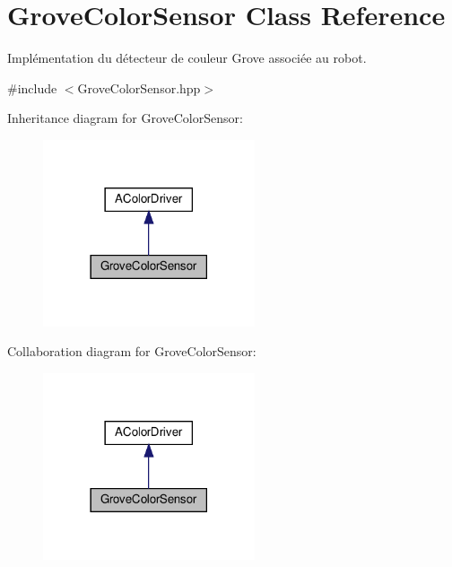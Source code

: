 \hypertarget{classGroveColorSensor}{}\section{Grove\+Color\+Sensor Class Reference}
\label{classGroveColorSensor}


Implémentation du détecteur de couleur Grove associée au robot.  




{\ttfamily \#include $<$Grove\+Color\+Sensor.\+hpp$>$}



Inheritance diagram for Grove\+Color\+Sensor\+:
\nopagebreak
\begin{figure}[H]
\begin{center}
\leavevmode
\includegraphics[width=177pt]{classGroveColorSensor__inherit__graph}
\end{center}
\end{figure}


Collaboration diagram for Grove\+Color\+Sensor\+:
\nopagebreak
\begin{figure}[H]
\begin{center}
\leavevmode
\includegraphics[width=177pt]{classGroveColorSensor__coll__graph}
\end{center}
\end{figure}
